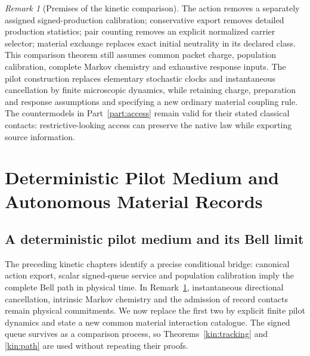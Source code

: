 \documentclass[11pt,oneside,openany]{book}
\theoremstyle{definition}
\theoremstyle{remark}\newtheorem{remark}[theorem]{Remark}
\providecommand{\pLaw}{\operatorname{Law}}
\providecommand{\pVar}{\operatorname{Var}}
\providecommand{\pSupp}{\operatorname{supp}}
\begin{document}
\begin{remark}[Premises of the kinetic comparison]\label{kin:boundary}
The action removes a separately assigned signed-production calibration;
conservative export removes detailed production statistics; pair counting
removes an explicit normalized carrier selector; material exchange replaces
exact initial neutrality in its declared class. This comparison theorem
still assumes common packet charge, population calibration, complete Markov
chemistry and exhaustive response inputs. The pilot construction
replaces elementary stochastic clocks and instantaneous cancellation by
finite microscopic dynamics, while retaining charge, preparation and response
assumptions and specifying a new ordinary material coupling rule.
The countermodels in Part~\ref{part:access} remain valid for their stated classical
contacts: restrictive-looking access can preserve the native law while
exporting source information.
\end{remark}


\part{Deterministic Pilot Medium and Autonomous Material Records}\label{part:pilot}

\providecommand{\pLaw}{\operatorname{Law}}
\providecommand{\pVar}{\operatorname{Var}}
\providecommand{\pSupp}{\operatorname{supp}}

\chapter{A deterministic pilot medium and its Bell limit}
\label{p:chapter-medium}

The preceding kinetic chapters identify a precise conditional bridge:
canonical action export, scalar signed-queue service and population
calibration imply the complete Bell path in physical time.  In
Remark~\ref{kin:boundary}, instantaneous directional cancellation,
intrinsic Markov chemistry and the admission of record contacts remain
physical commitments.  We now replace the first two by explicit finite
pilot dynamics and state a new common material interaction catalogue.
The signed queue survives as a comparison process, so
Theorems~\ref{kin:tracking} and \ref{kin:path} are used without repeating
their proofs.
\end{document}
